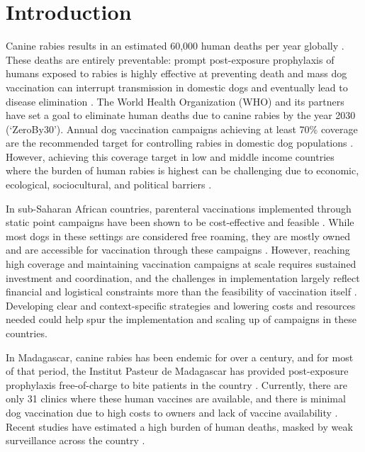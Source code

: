 \documentclass[tropicalmed,article,submit,moreauthors,pdftex]{mdpi}
\begin{document}

\hypertarget{introduction}{%
\section{Introduction}\label{introduction}}

Canine rabies results in an estimated 60,000 human deaths per year
globally \citep{hampson2015}. These deaths are entirely preventable:
prompt post-exposure prophylaxis of humans exposed to rabies is highly
effective at preventing death and mass dog vaccination can interrupt
transmission in domestic dogs and eventually lead to disease elimination
\citep{fooks2014}. The World Health Organization (WHO) and its partners
have set a goal to eliminate human deaths due to canine rabies by the
year 2030 (`ZeroBy30')\citep{abela-ridder2016}. Annual dog vaccination
campaigns achieving at least 70\% coverage are the recommended target
for controlling rabies in domestic dog populations
\citep{worldhealthorganization2013}. However, achieving this coverage
target in low and middle income countries where the burden of human
rabies is highest can be challenging due to economic, ecological,
sociocultural, and political barriers \citep{fahrion2017}.

In sub-Saharan African countries, parenteral vaccinations implemented
through static point campaigns have been shown to be cost-effective and
feasible \citep{borse2018}. While most dogs in these settings are
considered free roaming, they are mostly owned and are accessible for
vaccination through these campaigns \citep{morters2014, jibat2015}.
However, reaching high coverage and maintaining vaccination campaigns at
scale requires sustained investment and coordination, and the challenges
in implementation largely reflect financial and logistical constraints
more than the feasibility of vaccination itself \citep{fahrion2017}.
Developing clear and context-specific strategies and lowering costs and
resources needed could help spur the implementation and scaling up of
campaigns in these countries.

In Madagascar, canine rabies has been endemic for over a century, and
for most of that period, the Institut Pasteur de Madagascar has provided
post-exposure prophylaxis free-of-charge to bite patients in the country
\citep{reynes2011}. Currently, there are only 31 clinics where these
human vaccines are available, and there is minimal dog vaccination due
to high costs to owners and lack of vaccine availability
\citep{rajeev2018}. Recent studies have estimated a high burden of human
deaths, masked by weak surveillance across the country
\citep{rajeev2020, rajeev2018}.
\end{document}
